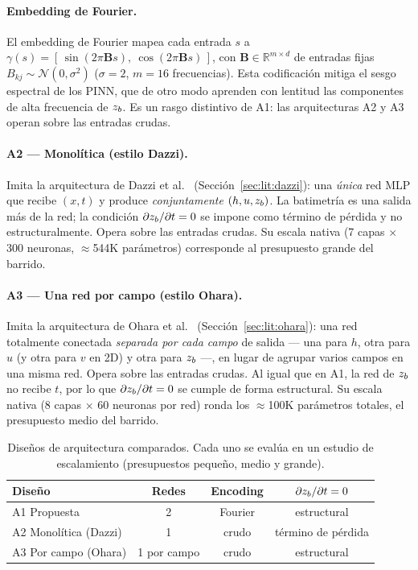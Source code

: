 \paragraph{Embedding de Fourier.}
El embedding de Fourier \cite{tancik2020} mapea cada entrada $s$ a
$\gamma(s) = [\,\sin(2\pi \bm{B}s),\ \cos(2\pi \bm{B}s)\,]$, con
$\bm{B}\in\mathbb{R}^{m\times d}$ de entradas fijas
$B_{kj}\sim\mathcal{N}(0,\sigma^2)$ ($\sigma = 2$, $m = 16$ frecuencias). Esta
codificación mitiga el sesgo espectral de los PINN, que de otro modo aprenden
con lentitud las componentes de alta frecuencia de $z_b$. Es un rasgo
distintivo de A1: las arquitecturas A2 y A3 operan sobre las entradas crudas.

\paragraph{A2 --- Monolítica (estilo Dazzi).}
Imita la arquitectura de Dazzi et al.\ \cite{dazzi2024}
(Sección~\ref{sec:lit:dazzi}): una \emph{única} red MLP que recibe $(x,t)$ y
produce \emph{conjuntamente} $(h, u, z_b)$. La batimetría es
una salida más de la red; la condición $\partial z_b/\partial t = 0$ se impone
como término de pérdida y no estructuralmente. Opera sobre las entradas
crudas. Su escala nativa (7 capas $\times$ 300 neuronas, $\approx$544K
parámetros) corresponde al presupuesto grande del barrido.

\paragraph{A3 --- Una red por campo (estilo Ohara).}
Imita la arquitectura de Ohara et al.\ \cite{ohara2024}
(Sección~\ref{sec:lit:ohara}): una red totalmente conectada \emph{separada por
cada campo} de salida --- una para $h$, otra para $u$ (y otra para $v$ en 2D) y
otra para $z_b$ ---, en lugar de agrupar varios campos en una misma red. Opera
sobre las entradas crudas. Al igual que en A1, la red de $z_b$ no recibe $t$,
por lo que $\partial z_b/\partial t = 0$ se cumple de forma estructural. Su
escala nativa (8 capas $\times$ 60 neuronas por red) ronda los $\approx$100K
parámetros totales, el presupuesto medio del barrido.

\begin{table}[H]
\centering
\caption{Diseños de arquitectura comparados. Cada uno se evalúa en un estudio
         de escalamiento (presupuestos pequeño, medio y grande).}
\label{tab:arch-cost}
\begin{tabular}{@{}lccc@{}}
\toprule
Diseño & Redes & Encoding & $\partial z_b/\partial t = 0$ \\
\midrule
A1 Propuesta          & 2           & Fourier & estructural \\
A2 Monolítica (Dazzi) & 1           & crudo   & término de pérdida \\
A3 Por campo (Ohara)  & 1 por campo & crudo   & estructural \\
\bottomrule
\end{tabular}
\end{table}

